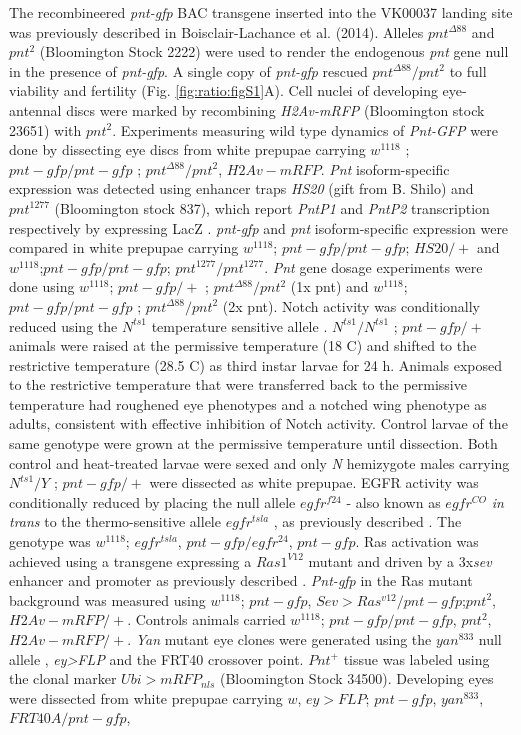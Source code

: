 The recombineered \textit{pnt-gfp} BAC transgene inserted into the VK00037 landing site was previously described in Boisclair-Lachance et al. (2014). Alleles $pnt^{\Delta 88}$ \cite{ONeill1994a} and $pnt^2$ (Bloomington Stock 2222) were used to render the endogenous \textit{pnt} gene null in the presence of \textit{pnt-gfp}. A single copy of \textit{pnt-gfp} rescued $pnt^{\Delta 88}/pnt^2$ to full viability and fertility (Fig. \ref{fig:ratio:figS1}A). Cell nuclei of developing eye-antennal discs were marked by recombining \textit{H2Av-mRFP} (Bloomington stock 23651) with $pnt^2$. Experiments measuring wild type dynamics of \textit{Pnt-GFP} were done by dissecting eye discs from white prepupae carrying $w^{1118}$ ; $pnt-gfp / pnt-gfp$ ; $pnt^{\Delta 88}/pnt^2$, $H2Av-mRFP$. \textit{Pnt} isoform-specific expression was detected using enhancer traps \textit{HS20} (gift from B. Shilo) and $pnt^{1277}$ (Bloomington stock 837), which report \textit{PntP1} and \textit{PntP2} transcription respectively by expressing LacZ \cite{Scholz1993}. \textit{pnt-gfp} and \textit{pnt} isoform-specific expression were compared in white prepupae carrying $w^{1118}$; $pnt-gfp/pnt-gfp$; $HS20/+$ and $w^{1118}$;$pnt-gfp/pnt-gfp$; $pnt^{1277}/pnt^{1277}$. \textit{Pnt} gene dosage experiments were done using $w^{1118}$; $pnt-gfp/+$ ; $pnt^{\Delta 88}/pnt^2$ (1x pnt) and $w^{1118}$; $pnt-gfp/pnt-gfp$ ; $pnt^{\Delta 88}/pnt^2$ (2x pnt). Notch activity was conditionally reduced using the $N^{ts1}$ temperature sensitive allele \cite{Shellenbarger1975}. $N^{ts1}/N^{ts1}$ ; $pnt-gfp/+$ animals were raised at the permissive temperature (18 \textdegree{}C) and shifted to the restrictive temperature (28.5 \textdegree{}C) as third instar larvae for 24 h. Animals exposed to the restrictive temperature that were transferred back to the permissive temperature had roughened eye phenotypes and a notched wing phenotype as adults, consistent with effective inhibition of Notch activity. Control larvae of the same genotype were grown at the permissive temperature until dissection. Both control and heat-treated larvae were sexed and only \textit{N} hemizygote males carrying $N^{ts1}/Y$ ; $pnt-gfp/+$ were dissected as white prepupae. EGFR activity was conditionally reduced by placing the null allele $egfr^{f24}$ - also known as $egfr^{CO}$ \cite{Clifford1989} \textit{in trans} to the thermo-sensitive allele $egfr^{tsla}$ \cite{Kumar1998}, as previously described \cite{Pelaez2015a}. The genotype was $w^{1118}$; $egfr^{tsla}$, $pnt-gfp/egfr^{24}$, $pnt-gfp$. Ras activation was achieved using a transgene expressing a $Ras1^{V12}$ mutant and driven by a 3x\textit{sev} enhancer and promoter \cite{Fortini1992} as previously described \cite{Pelaez2015a}. \textit{Pnt-gfp} in the Ras mutant background was measured using $w^{1118}$; $pnt-gfp$, $Sev>Ras^{v12}/pnt-gfp$;$pnt^2$,$H2Av-mRFP/+$. Controls animals carried $w^{1118}$; $pnt-gfp/pnt-gfp$, $pnt^2$, $H2Av-mRFP/+$. \textit{Yan} mutant eye clones were generated using the $yan^{833}$ null allele \cite{Webber2013}, \textit{ey>FLP} and the FRT40 crossover point. $Pnt^+$ tissue was labeled using the clonal marker $Ubi>mRFP_{nls}$ (Bloomington Stock 34500). Developing eyes were dissected from white prepupae carrying $w$, $ey>FLP$; $pnt-gfp$, $yan^{833}$, $FRT40A/pnt-gfp$, 